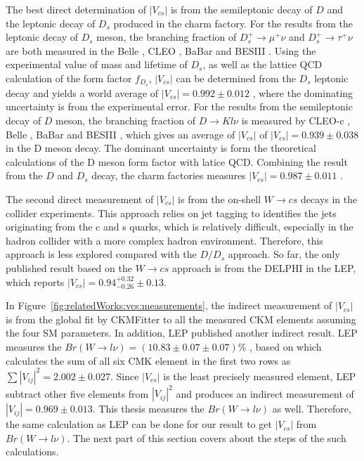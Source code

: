 The best direct determination of $|V_{cs}|$ is from the semileptonic decay of $D$ and the leptonic decay of $D_s$ produced in the charm factory. For the results from the leptonic decay of $D_s$ meson, the branching fraction of $D_s^+ \to \mu^+ \nu$ and $D_s^+ \to \tau^+ \nu$ are both measured in the Belle \cite{Zupanc:2013byn}, CLEO \cite{Alexander:2009ux,Onyisi:2009th,Naik:2009tk}, BaBar \cite{delAmoSanchez:2010jg} and BESIII \cite{Ablikim:2016duz, Ablikim:2018jun}. Using the experimental value of mass and lifetime of $D_s$, as well as the lattice QCD calculation of the form factor $f_{D_s}$, $|V_{cs}|$ can be determined from the $D_s$ leptonic decay and yields a world average of $|V_{cs}|=0.992\pm 0.012$ \cite{Amhis:2019ckw}, where the dominating uncertainty is from the experimental error. For the results from the semileptonic decay of $D$ meson, the branching fraction of $D\to K l\nu$ is measured by CLEO-c \cite{Besson:2009uv}, Belle \cite{Widhalm:2006wz}, BaBar \cite{Aubert:2007wg} and BESIII \cite{Ablikim:2015ixa, Ablikim:2018evp}, which gives an average of $|V_{cs}|$ of $|V_{cs}|=0.939\pm 0.038$ \cite{Amhis:2019ckw} in the D meson decay. The dominant uncertainty is form the theoretical calculations of the D meson form factor with latice QCD. Combining the result from the $D$ and $D_s$ decay, the charm factories measures $|V_{cs}|=0.987\pm 0.011$ \cite{Amhis:2019ckw}.

The second direct measurement of $|V_{cs}|$ is from the on-shell $W\to c s$ decays in the collider experiments. This approach relies on jet tagging to identifies the jets originating from the c and s quarks, which is relatively difficult, especially in the hadron collider with a more complex hadron environment. Therefore, this approach is less explored compared with the $D/D_s$ approach. So far, the only published result based on the $W\to c s$  approach is from the DELPHI in the LEP, which reports $|V_{cs}|=0.94 ^{+0.32}_{-0.26}\pm 0.13$. \cite{Abreu:1998ap}

In Figure~\ref{fig:relatedWorks:vcs:measurements}, the indirect measurement of $|V_{cs}|$ is from the global fit by CKMFitter to all the measured CKM elements assuming the four SM parameters. In addition, LEP published another indirect result. LEP measures the $Br(W\to l \nu) = (10.83 \pm 0.07 \pm 0.07) \%$ \cite{Schael:2013ita}, based on which calculates the sum of all six CMK element in the first two rows as $\sum |V_{ij}|^2 = 2.002 \pm 0.027$. Since $|V_{cs}|$ is the least precisely measured element, LEP subtract other five elements from $|V_{ij}|^2 $ and produces an indirect measurement of $|V_{ij}|=0.969\pm 0.013$. This thesis measures the $Br(W\to l \nu) $ as well. Therefore, the same calculation as LEP can be done for our result to get $|V_{cs}|$ from $Br(W\to l \nu)$. The next part of this section covers about the steps of the such calculations.


